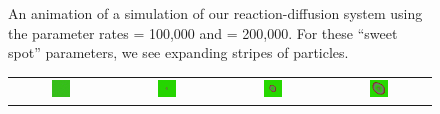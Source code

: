\begin{figure}[h]
\begin{tabular}{c c c c}
\end{tabular}
\caption{An animation of a simulation of our reaction-diffusion system using the parameter rates  = 100,000 and  = 200,000. For these ``sweet spot'' parameters, we see expanding stripes of  particles.}
\label{fig:k=200000_f=100000}
\end{figure}

\begin{figure}[h]
\centering
\mySfFamily
\begin{tabular}{c c c c}
\includegraphics[width = 0.19\textwidth]{../images_CMYK/predator_prey_11_by_11_f_1.4_k_2} & \includegraphics[width = 0.19\textwidth]{../images_CMYK/../images_CMYK/predator_prey_11_by_11_f_1.4_k_2_i1} & \includegraphics[width = 0.19\textwidth]{../images_CMYK/../images_CMYK/predator_prey_11_by_11_f_1.4_k_2_i2} & \includegraphics[width = 0.19\textwidth]{../images_CMYK/../images_CMYK/predator_prey_11_by_11_f_1.4_k_2_i3}\\[2ex]

\end{tabular}
\end{figure}
